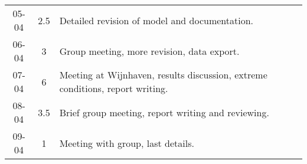 \begin{longtable}[c]{c|c|m{35em}}
05-04   &   2.5     &   Detailed revision of model and documentation.                                \\
06-04   &   3       &   Group meeting, more revision, data export.                                   \\
07-04   &   6       &   Meeting at Wijnhaven, results discussion, extreme conditions, report writing.\\
08-04   &   3.5     &   Brief group meeting, report writing and reviewing.                           \\
09-04   &   1       &   Meeting with group, last details. \\



\end{longtable}

